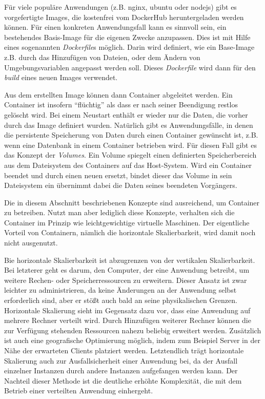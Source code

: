 \documentclass[11pt,a4paper]{article}
\begin{document}
Für viele populäre Anwendungen (z.B. nginx, ubuntu oder nodejs) gibt es vorgefertigte Images, die kostenfrei vom DockerHub %
heruntergeladen werden können.
Für einen konkreten Anwendungsfall kann es sinnvoll sein, ein bestehendes Basis-Image für die eigenen Zwecke anzupassen.
Dies ist mit Hilfe eines sogenannten \emph{Dockerfile}s möglich. Darin wird definiert, wie ein Base-Image z.B. durch das Hinzufügen von Dateien,
oder dem Ändern von Umgebungsvariablen angepasst werden soll. Dieses \emph{Dockerfile} wird dann für den \emph{build}
eines neuen Images verwendet.

Aus dem erstellten Image können dann Container abgeleitet werden. Ein Container ist insofern ``flüchtig'' als dass er nach seiner
Beendigung restlos gelöscht wird. Bei einem Neustart enthält er wieder nur die Daten, die vorher durch das Image definiert wurden.
Natürlich gibt es Anwendungsfälle, in denen die persistente Speicherung von Daten durch einen Container gewünscht ist, z.B. wenn
eine Datenbank in einem Container betrieben wird. Für diesen Fall gibt es das Konzept der \emph{Volumes}.
Ein Volume spiegelt einen definierten Speicherbereich aus dem Dateisystem des Containers auf das Host-System. 
Wird ein Container beendet und durch einen neuen ersetzt, bindet dieser das Volume in sein Dateisystem ein übernimmt dabei die Daten seines beendeten Vorgängers.

Die in diesem Abschnitt beschriebenen Konzepte sind ausreichend, um Container zu betreiben.
Nutzt man aber lediglich diese Konzepte, verhalten sich die Container im Prinzip wie leichtgewichtige virtuelle Maschinen.
Der eigentliche Vorteil von Containern, nämlich die horizontale Skalierbarkeit, wird damit noch nicht ausgenutzt.

Bie horizontale Skalierbarkeit ist abzugrenzen von der vertikalen Skalierbarkeit. Bei letzterer geht es darum, den Computer, der eine Anwendung betreibt,
um weitere Rechen- oder Speicherressourcen zu erweitern. Dieser Ansatz ist zwar leichter zu administrieren, da keine Änderungen an der Anwendung selbst
erforderlich sind, aber er stößt auch bald an seine physikalischen Grenzen. Horizontale Skalierung sieht im Gegensatz dazu vor, dass eine Anwendung
auf mehrere Rechner verteilt wird. Durch Hinzufügen weiterer Rechner können die zur Verfügung stehenden Ressourcen nahezu beliebig erweitert werden.
Zusätzlich ist auch eine geografische Optimierung möglich, indem zum Beispiel Server in der Nähe der erwarteten Clients platziert werden. 
Letztendlich trägt horizontale Skalierung auch zur Ausfallsicherheit einer Anwendung bei, da der Ausfall einzelner Instanzen durch andere Instanzen
aufgefangen werden kann.
Der Nachteil dieser Methode ist die deutliche erhöhte Komplexität, die mit dem Betrieb einer verteilten Anwendung einhergeht.
\end{document}
